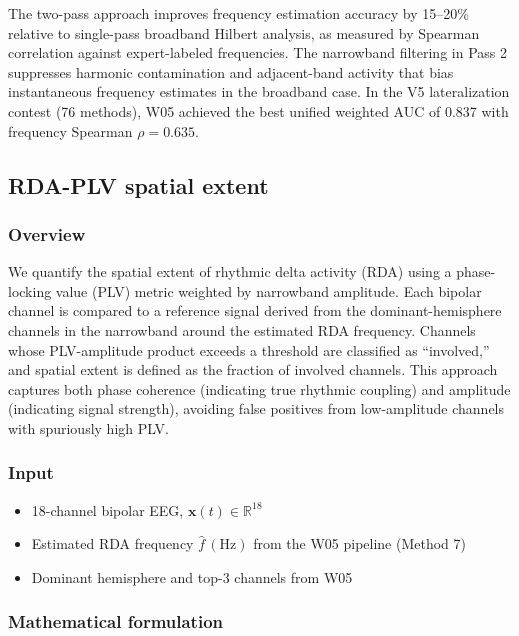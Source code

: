 The two-pass approach improves frequency estimation accuracy by 15--20\% relative to single-pass broadband Hilbert analysis, as measured by Spearman correlation against expert-labeled frequencies. The narrowband filtering in Pass 2 suppresses harmonic contamination and adjacent-band activity that bias instantaneous frequency estimates in the broadband case. In the V5 lateralization contest (76 methods), W05 achieved the best unified weighted AUC of 0.837 with frequency Spearman $\rho = 0.635$.

\subsection{RDA-PLV spatial extent}
\label{app:rda_plv}

\subsubsection{Overview}

We quantify the spatial extent of rhythmic delta activity (RDA) using a phase-locking value (PLV) metric weighted by narrowband amplitude. Each bipolar channel is compared to a reference signal derived from the dominant-hemisphere channels in the narrowband around the estimated RDA frequency. Channels whose PLV-amplitude product exceeds a threshold are classified as ``involved,'' and spatial extent is defined as the fraction of involved channels. This approach captures both phase coherence (indicating true rhythmic coupling) and amplitude (indicating signal strength), avoiding false positives from low-amplitude channels with spuriously high PLV.

\subsubsection{Input}

\begin{itemize}
  \item 18-channel bipolar EEG, $\mathbf{x}(t) \in \mathbb{R}^{18}$
  \item Estimated RDA frequency $\hat{f}\,(\mathrm{Hz})$ from the W05 pipeline (Method 7)
  \item Dominant hemisphere and top-3 channels from W05
\end{itemize}

\subsubsection{Mathematical formulation}

